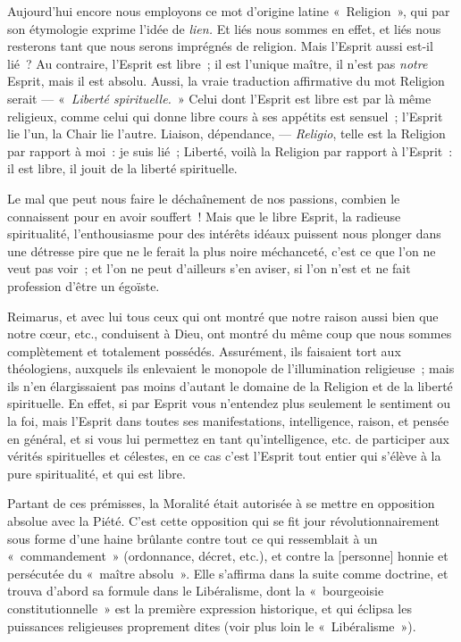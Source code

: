 \documentclass[french,twoside]{book} %
\newcommand\corr[1]{#1}
\begin{document}
Aujourd’hui encore nous employons ce mot d’origine latine « Religion », qui par son étymologie exprime l’idée de \emph{lien.} Et liés nous sommes en effet, et liés nous resterons tant que nous serons imprégnés de religion. Mais l’Esprit aussi est-il lié ? Au contraire, l’Esprit est libre ; il est l’unique maître, il n’est pas \emph{notre }Esprit, mais il est absolu. Aussi, la vraie traduction affirmative du mot Religion serait — « \emph{Liberté spirituelle.} » Celui dont l’Esprit est libre est par là même religieux, comme celui qui donne libre cours à ses appétits est sensuel ; l’Esprit lie l’un, la Chair lie l’autre. Liaison, dépendance, — \emph{Religio}, telle est la Religion par rapport à moi : je suis lié ; Liberté, voilà la Religion par rapport à l’Esprit : il est libre, il jouit de la liberté spirituelle.\par
Le mal que peut nous faire le déchaînement de nos passions, combien le connaissent pour en avoir souffert ! Mais que le libre Esprit, la radieuse spiritualité, l’enthousiasme pour des intérêts idéaux puissent nous plonger dans une détresse pire que ne le ferait la plus noire méchanceté, c’est ce que l’on ne veut pas voir ; et l’on ne peut d’ailleurs s’en aviser, si l’on n’est et ne fait profession d’être un égoïste.\par
Reimarus, et avec lui tous ceux qui ont montré que notre raison aussi bien que notre cœur, etc., conduisent à Dieu, ont montré du même coup que nous  sommes complètement et totalement possédés. Assurément, ils faisaient tort aux théologiens, auxquels ils enlevaient le monopole de l’illumination religieuse ; mais ils n’en élargissaient pas moins d’autant le domaine de la Religion et de la liberté spirituelle. En effet, si par Esprit vous n’entendez plus seulement le sentiment ou la foi, mais l’Esprit dans toutes ses manifestations, intelligence, raison, et pensée en général, et si vous lui permettez en tant qu’intelligence, etc. de participer aux vérités spirituelles et célestes, en ce cas c’est l’Esprit tout entier qui s’élève à la pure spiritualité, et qui est libre.\par
Partant de ces prémisses, la Moralité était autorisée à se mettre en opposition absolue avec la Piété. C’est cette opposition qui se fit jour révolutionnairement sous forme d’une haine brûlante contre tout ce qui ressemblait à un « commandement » (ordonnance, décret, etc.), et contre la [{\corr personne}] honnie et persécutée du « maître absolu ». Elle s’affirma dans la suite comme doctrine, et trouva d’abord sa formule dans le Libéralisme, dont la « bourgeoisie constitutionnelle » est la première expression historique, et qui éclipsa les puissances religieuses proprement dites (voir plus loin le « Libéralisme »).\par
\end{document}
